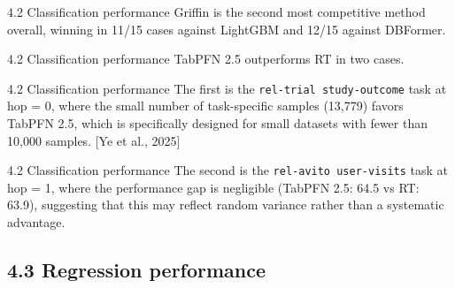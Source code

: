 \documentclass[aspectratio=169,10pt]{beamer}
\newcommand{\cit}[1]{{\scriptsize\color{gray}[#1]}}
\begin{document}
\begin{frame}{4.2 Classification performance}
Griffin is the second most competitive method overall, winning in 11/15 cases against LightGBM and 12/15 against DBFormer.
\end{frame}

\begin{frame}{4.2 Classification performance}
TabPFN 2.5 outperforms RT in two cases.
\end{frame}

\begin{frame}{4.2 Classification performance}
The first is the \texttt{rel-trial study-outcome} task at hop = 0, where the small number of task-specific samples (13,779) favors TabPFN 2.5, which is specifically designed for small datasets with fewer than 10,000 samples.
\cit{Ye et al., 2025}
\end{frame}

\begin{frame}{4.2 Classification performance}
The second is the \texttt{rel-avito user-visits} task at hop = 1, where the performance gap is negligible (TabPFN 2.5: 64.5 vs RT: 63.9), suggesting that this may reflect random variance rather than a systematic advantage.
\end{frame}

\subsection{4.3 Regression performance}
\end{document}
